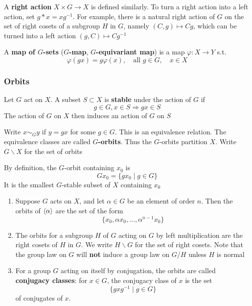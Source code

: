 \documentclass[11pt]{article}
\begin{document}
A \textbf{right action} \(X\times G\to X\) is defined similarly. To turn a right action into a left action,
set \(g*x=xg^{-1}\). For example, there is a natural right action of \(G\) on the set of right
cosets of a subgroup \(H\) in \(G\), namely \((C,g)\mapsto Cg\), which can be turned into a left
action \((g,C)\mapsto Cg^{-1}\)

A \textbf{map of \(G\)-sets} (\textbf{\(G\)-map}, \textbf{\(G\)-equivariant map}) is a map \(\varphi:X\to Y\) s.t.
\begin{equation*}
\varphi(gx)=g\varphi(x),\quad\text{all }g\in G,\quad x\in X
\end{equation*}

\subsubsection{Orbits}
\label{sec:orge74b06c}
Let \(G\) act on \(X\). A subset \(S\subset X\) is \textbf{stable} under the action of \(G\) if
\begin{equation*}
g\in G,x\in S\Rightarrow gx\in S
\end{equation*}
The action of \(G\) on \(X\) then induces an action of \(G\) on \(S\)

Write \(x\sim_Gy\) if \(y=gx\) for some \(g\in G\). This is an equivalence relation. The equivalence
classes are called \textbf{\(G\)-orbits}. Thus the \(G\)-orbits partition \(X\). Write \(G\backslash X\)
for the set of orbits

By definition, the \(G\)-orbit containing \(x_0\) is
\begin{equation*}
Gx_0=\{gx_0\mid g\in G\}
\end{equation*}
It is the smallest \(G\)-stable subset of \(X\) containing \(x_0\)

\begin{examplle}[]
\begin{enumerate}
\item Suppose \(G\) acts on \(X\), and let \(\alpha\in G\) be an element of order \(n\). Then the orbits
of \(\langle\alpha\rangle\) are the set of the form
\begin{equation*}
\{x_0,\alpha x_0,\dots,\alpha^{n-1}x_0\}
\end{equation*}
\item The orbits for a subgroup \(H\) of \(G\) acting on \(G\) by left multiplication are the right
cosets of \(H\) in \(G\). We write \(H\backslash G\) for the set of right cosets. Note that
the group law on \(G\) will \textbf{not} induce a group law on \(G/H\) unless \(H\) is normal
\item For a group \(G\) acting on itself by conjugation, the orbits are called \textbf{conjugacy classes}:
for \(x\in G\), the conjugacy class of \(x\) is the set
\begin{equation*}
\{gxg^{-1}\mid g\in G\}
\end{equation*}
of conjugates of \(x\).
\end{enumerate}
\end{examplle}
\end{document}
